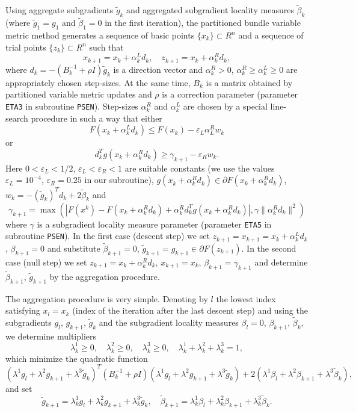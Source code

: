\documentclass{esub2acm}
\newcommand{\be}{\begin{equation}}
\newcommand{\ee}{\end{equation}}
\newcommand{\bd}{\begin{displaymath}}
\newcommand{\ed}{\end{displaymath}}
\begin{document}
Using aggregate subgradients $\tilde{g}_k$ and aggregated subgradient
locality measures $\tilde{\beta}_k$ (where $\tilde{g}_1 = g_1$ and
$\tilde{\beta}_1 = 0$ in the first iteration), the partitioned bundle
variable metric method generates a sequence of basic points
$\{x_k\} \subset R^n$ and a sequence of trial points $\{z_k\} \subset R^n$
such that
%
$$x_{k+1}=x_k + \alpha_k^L d_k, \quad z_{k+1} = x_k + \alpha_k^R d_k,$$
%
where $d_k = -(B_k^{-1} + \rho I) \tilde{g}_k$ is a direction vector and
$\alpha_k^R > 0$, $\alpha_k^R \geq \alpha_k^L \geq 0$ are appropriately
chosen step-sizes. At the same time, $B_k$ is a matrix obtained by
partitioned variable metric updates and $\rho$ is a correction parameter
(parameter {\tt ETA3} in subroutine {\tt PSEN}). Step-sizes
$\alpha_k^R$ and $\alpha_k^L$ are chosen by a special line-search
procedure in such a way that either
%
$$F(x_k + \alpha_k^L d_k) \leq F(x_k) - \varepsilon_L \alpha_L^R w_k$$
%
or
%
$$d_k^T g(x_k + \alpha_k^R d_k) \geq \gamma_{k+1} - \varepsilon_R w_k.$$
%
Here $0 < \varepsilon_L < 1/2$, $\varepsilon_L < \varepsilon_R < 1$
are suitable constants (we use the values $\varepsilon_L = 10^{-4}$,
$\varepsilon_R=0.25$ in our subroutine),
$g(x_k + \alpha_k^R d_k) \in \partial F(x_k + \alpha_k^R d_k)$,
$w_k = -(\tilde{g}_k)^T d_k + 2 \tilde{\beta}_k$ and
%
$$\gamma_{k+1} = \max \left( |F(x^k) - F(x_k + \alpha_k^R d_k) + \alpha_k^R d_k^T
g(x_k + \alpha_k^R d_k)|, \gamma \|\alpha_k^R d_k\|^2 \right)$$
%
where $\gamma$ is a subgradient locality measure parameter (parameter
{\tt ETA5} in subroutine {\tt PSEN}). In the first case (descent step)
we set $z_{k+1} = x_{k+1} = x_k + \alpha_k^L d_k$, $\beta_{k+1}=0$
and substitute $\tilde \beta_{k+1}=0$, $\tilde g_{k+1} = g_{k+1} \in \partial F(z_{k+1})$.
In the second case (null step) we set $z_{k+1} = x_k + \alpha_k^R d_k$,
$x_{k+1} = x_k$, $\beta_{k+1}=\gamma_{k+1}$ and determine
$\tilde \beta_{k+1}$, $\tilde g_{k+1}$ by the aggregation procedure.

The aggregation procedure is very simple. Denoting by $l$ the lowest index
satisfying $x_l = x_k$ (index of the iteration after the last descent
step) and using the subgradients $g_l$,
$g_{k+1}$, $\tilde{g}_k$ and the subgradient
locality measures $\beta_l = 0$, $\beta_{k+1}$, $\tilde \beta_k$,
we determine multipliers
%
\bd
\lambda_k^1 \ge 0, \quad \lambda_k^2 \ge 0, \quad \lambda_k^3 \ge 0, \quad
\lambda_k^1 + \lambda_k^2 + \lambda_k^3 = 1,
\ed
%
which minimize the quadratic function
%
\bd
(\lambda^1 g_l + \lambda^2 g_{k+1} + \lambda^3 \tilde{g}_k)^T (B_k^{-1} + \rho I)
(\lambda^1 g_l + \lambda^2 g_{k+1} + \lambda^3 \tilde{g}_k) +
2 (\lambda^1 \beta_l + \lambda^2 \beta_{k+1} + \lambda^3 \tilde{\beta}_k),
\ed
%
and set
%
\bd
\tilde g_{k+1} = \lambda_k^1 g_l + \lambda_k^2 g_{k+1} + \lambda_k^3 \tilde g_k, \quad
\tilde{\beta}_{k+1} =  \lambda_k^1 \beta_l + \lambda_k^2 \beta_{k+1} +
\lambda_k^3 \tilde{\beta}_k.
\ed
\end{document}
